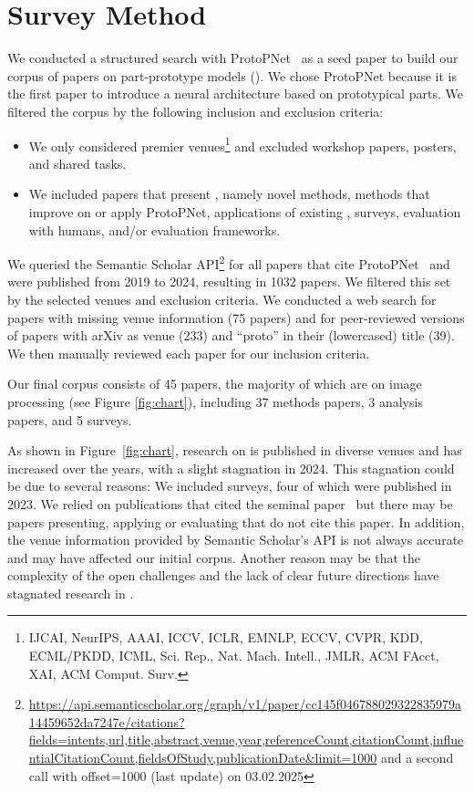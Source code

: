\section{Survey Method}
\label{sec:method}

We conducted a structured search with ProtoPNet~\citep{Chen_2019_ThisLooksThat} as a seed paper to build our corpus of papers on part-prototype models (\ppms). 
We chose ProtoPNet because it is the first paper to introduce a neural architecture based on prototypical parts. 
We filtered the corpus by the following inclusion and exclusion criteria:
\begin{itemize}
    \item We only considered premier venues\footnote{IJCAI, NeurIPS, AAAI, ICCV, ICLR, EMNLP, ECCV, CVPR, KDD, ECML/PKDD, ICML, Sci. Rep., Nat. Mach. Intell., JMLR, ACM FAcct, XAI, ACM Comput. Surv.} and excluded workshop papers, posters, and shared tasks.
    \item We included papers that present \ppms, namely novel methods, methods that improve on or apply ProtoPNet, applications of existing \ppms, surveys, evaluation with humans, and/or evaluation frameworks.
\end{itemize}
We queried the Semantic Scholar API\footnote{\url{https://api.semanticscholar.org/graph/v1/paper/cc145f046788029322835979a14459652da7247e/citations?fields=intents,url,title,abstract,venue,year,referenceCount,citationCount,influentialCitationCount,fieldsOfStudy,publicationDate&limit=1000} and a second call with offset=1000 (last update) on 03.02.2025 } for all papers that cite ProtoPNet~\citep{Chen_2019_ThisLooksThat} and were published from 2019 to 2024, resulting in 1032 papers.
We filtered this set by the selected venues and exclusion criteria. We conducted a web search for papers with missing venue information (75 papers) and for peer-reviewed versions of papers with arXiv as venue (233) and ``proto'' in their (lowercased) title (39).
We then manually reviewed each paper for our inclusion criteria. 


Our final corpus consists of 45 papers, the majority of which are on image processing (see Figure \ref{fig:chart}), including 37 methods papers, 3 analysis papers, and 5 surveys.

As shown in Figure~\ref{fig:chart}, research on \ppms is published in diverse venues and has increased over the years, with a slight stagnation in 2024. This stagnation could be due to several reasons: We included surveys, four of which were published in 2023. We relied on publications that cited the seminal paper~\citep{Chen_2019_ThisLooksThat} but there may be papers presenting, applying or evaluating \ppms that do not cite this paper. In addition, the venue information provided by Semantic Scholar's API is not always accurate and may have affected our initial corpus. 
Another reason may be that the complexity of the open challenges and the lack of clear future directions have stagnated research in \ppms.

